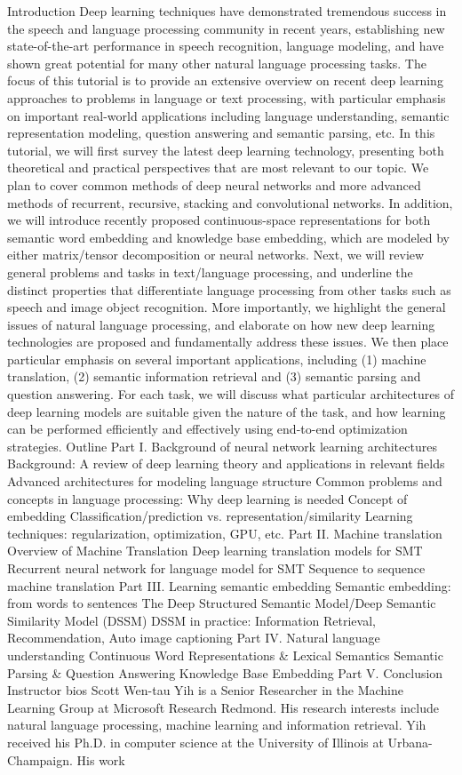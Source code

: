 Introduction Deep learning techniques have demonstrated tremendous success in the speech and language processing community in recent years, establishing new state-of-the-art performance in speech recognition, language modeling, and have shown great potential for many other natural language processing tasks. The focus of this tutorial is to provide an extensive overview on recent deep learning approaches to problems in language or text processing, with particular emphasis on important real-world applications including language understanding, semantic representation modeling, question answering and semantic parsing, etc. In this tutorial, we will first survey the latest deep learning technology, presenting both theoretical and practical perspectives that are most relevant to our topic. We plan to cover common methods of deep neural networks and more advanced methods of recurrent, recursive, stacking and convolutional networks. In addition, we will introduce recently proposed continuous-space representations for both semantic word embedding and knowledge base embedding, which are modeled by either matrix/tensor decomposition or neural networks. Next, we will review general problems and tasks in text/language processing, and underline the distinct properties that differentiate language processing from other tasks such as speech and image object recognition. More importantly, we highlight the general issues of natural language processing, and elaborate on how new deep learning technologies are proposed and fundamentally address these issues. We then place particular emphasis on several important applications, including (1) machine translation, (2) semantic information retrieval and (3) semantic parsing and question answering. For each task, we will discuss what particular architectures of deep learning models are suitable given the nature of the task, and how learning can be performed efficiently and effectively using end-to-end optimization strategies. Outline Part I. Background of neural network learning architectures Background: A review of deep learning theory and applications in relevant fields Advanced architectures for modeling language structure Common problems and concepts in language processing: Why deep learning is needed Concept of embedding Classification/prediction vs. representation/similarity Learning techniques: regularization, optimization, GPU, etc. Part II. Machine translation Overview of Machine Translation Deep learning translation models for SMT Recurrent neural network for language model for SMT Sequence to sequence machine translation Part III. Learning semantic embedding Semantic embedding: from words to sentences The Deep Structured Semantic Model/Deep Semantic Similarity Model (DSSM) DSSM in practice: Information Retrieval, Recommendation, Auto image captioning Part IV. Natural language understanding Continuous Word Representations \& Lexical Semantics Semantic Parsing \& Question Answering Knowledge Base Embedding Part V. Conclusion Instructor bios Scott Wen-tau Yih is a Senior Researcher in the Machine Learning Group at Microsoft Research Redmond. His research interests include natural language processing, machine learning and information retrieval. Yih received his Ph.D. in computer science at the University of Illinois at Urbana-Champaign. His work 